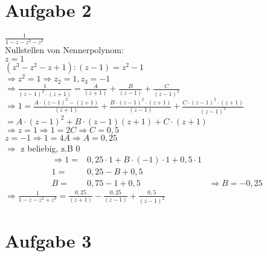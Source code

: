 \documentclass[11pt,a4paper]{article}
\begin{document}
  \section*{Aufgabe 2}

    $\frac{1}{1-z-z^2-z^3}$\\
    Nullstellen von Nennerpolynom:\\
    $z=1$\\
    $(z^3-z^2-z+1) : (z-1)=z^2-1$\\
    $\Rightarrow z^2=1 \Rightarrow z_2=1,z_3=-1$\\
    $\Rightarrow \frac{1}{\left(z-1\right)^2\cdot\left(z+1\right)}=\frac{A}{\left(z+1\right)}+\frac{B}{\left(z-1\right)}+\frac{C}{\left(z-1\right)^2}$\\
    $\Rightarrow 1=\frac{A\cdot \left(z-1\right)^2-\left(z+1\right)}{\left(z+1\right)}+\frac{B\cdot \left(z-1\right)^2\cdot \left(z+1\right)}{\left(z-1\right)}+\frac{C\cdot \left(z-1\right)^2\cdot\left(z+1\right)}{\left(z-1\right)^2}$\\
    $=A\cdot \left(z-1\right)^2+B\cdot\left(z-1\right)\left(z+1\right)+C\cdot\left(z+1\right)$\\
    $\Rightarrow z=1 \Rightarrow 1=2C \Rightarrow C=0,5$\\
    $z=-1 \Rightarrow 1=4A \Rightarrow A=0,25$\\
    $\Rightarrow$ z beliebig, z.B $0$
    \begin{align*}
      \Rightarrow 1 =& 0,25 \cdot 1 + B \cdot \left( -1 \right) \cdot 1 + 0,5 \cdot 1\\
      1 =& 0,25 - B + 0,5\\
      B =& 0,75 - 1 + 0,5 &\Rightarrow B = -0,25
    \end{align*}
    $\Rightarrow \frac{1}{1-z-z^2+z^3} = \frac{0,25}{\left(z+1\right)} - \frac{0,25}{\left(z-1\right)}+ \frac{0,5}{\left(z-1\right)^2}$

    \newpage

  \section*{Aufgabe 3}
\end{document}
